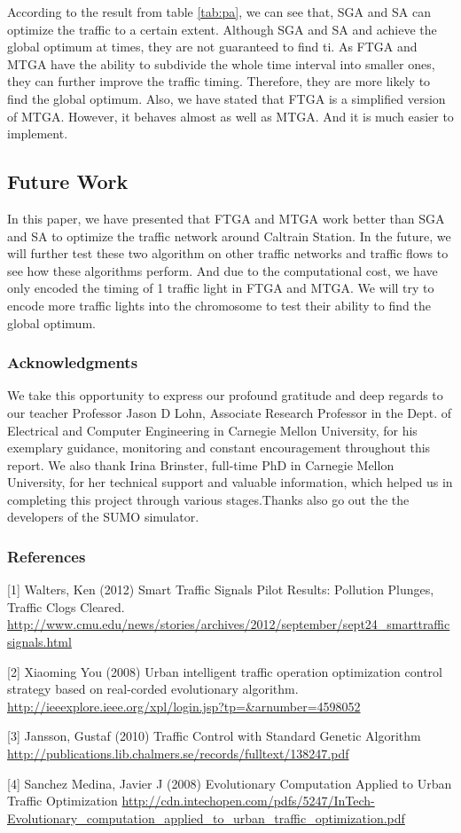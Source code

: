\documentclass{article} %
\begin{document}
According to the result from table \ref{tab:pa}, we can see that, SGA and SA can optimize the traffic to a certain extent. Although SGA and SA and achieve the global optimum at times, they are not guaranteed to find ti. As FTGA and MTGA have the ability to subdivide the whole time interval into smaller ones, they can further improve the traffic timing. Therefore, they are more likely to find the global optimum. Also, we have stated that FTGA is a simplified version of MTGA. However, it behaves almost as well as MTGA. And it is much easier to implement.

\subsection{Future Work}
In this paper, we have presented that FTGA and MTGA work better than SGA and SA to optimize the traffic network around Caltrain Station. In the future, we will further test these two algorithm on other traffic networks and traffic flows to see how these algorithms perform. And due to the computational cost, we have only encoded the timing of 1 traffic light in FTGA and MTGA. We will try to encode more traffic lights into the chromosome to test their ability to find the global optimum.

\subsubsection*{Acknowledgments}

We take this opportunity to express our profound gratitude and deep regards to our teacher Professor Jason D Lohn, Associate Research Professor in the Dept. of Electrical and Computer Engineering in Carnegie Mellon University, for his exemplary guidance, monitoring and constant encouragement throughout this report. We also thank Irina Brinster, full-time PhD in Carnegie Mellon University, for her technical support and valuable information, which helped us in completing this project  through various stages.Thanks also go out the the developers of the SUMO simulator.

\subsubsection*{References}

\small{
[1] Walters, Ken (2012) Smart Traffic Signals Pilot Results: Pollution Plunges, Traffic Clogs Cleared. \url{http://www.cmu.edu/news/stories/archives/2012/september/sept24_smarttrafficsignals.html}

[2] Xiaoming You (2008) Urban intelligent traffic operation optimization control strategy based on real-corded evolutionary algorithm. \url{http://ieeexplore.ieee.org/xpl/login.jsp?tp=&arnumber=4598052}

[3] Jansson, Gustaf (2010) Traffic Control with Standard Genetic Algorithm \url{http://publications.lib.chalmers.se/records/fulltext/138247.pdf}

[4] Sanchez Medina, Javier J (2008) Evolutionary Computation Applied to Urban Traffic Optimization \url{http://cdn.intechopen.com/pdfs/5247/InTech-Evolutionary_computation_applied_to_urban_traffic_optimization.pdf}
}
\end{document}

